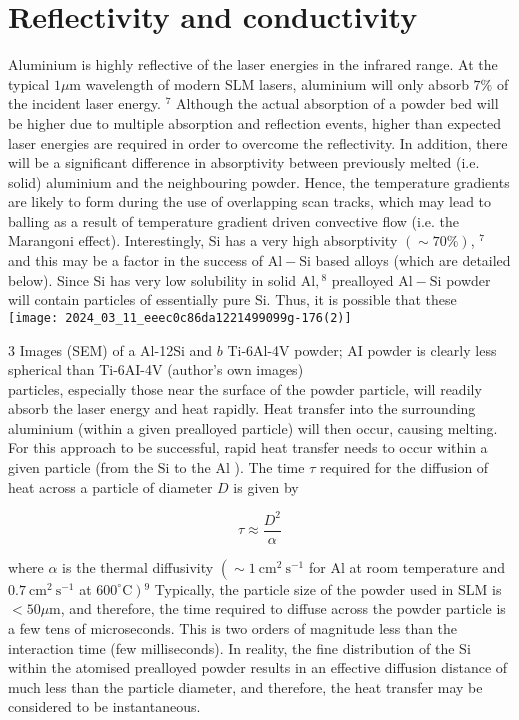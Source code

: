 \documentclass[10pt]{article}
\begin{document}
\section*{Reflectivity and conductivity}
Aluminium is highly reflective of the laser energies in the infrared range. At the typical $1 \mu \mathrm{m}$ wavelength of modern SLM lasers, aluminium will only absorb $7 \%$ of the incident laser energy. ${ }^{7}$ Although the actual absorption of a powder bed will be higher due to multiple absorption and reflection events, higher than expected laser energies are required in order to overcome the reflectivity. In addition, there will be a significant difference in absorptivity between previously melted (i.e. solid) aluminium and the neighbouring powder. Hence, the temperature gradients are likely to form during the use of overlapping scan tracks, which may lead to balling as a result of temperature gradient driven convective flow (i.e. the Marangoni effect). Interestingly, Si has a very high absorptivity $(\sim 70 \%)$, ${ }^{7}$ and this may be a factor in the success of $\mathrm{Al}-\mathrm{Si}$ based alloys (which are detailed below). Since Si has very low solubility in solid $\mathrm{Al},{ }^{8}$ prealloyed $\mathrm{Al}-\mathrm{Si}$ powder will contain particles of essentially pure $\mathrm{Si}$. Thus, it is possible that these\\
\texttt{[image: 2024\_03\_11\_eeec0c86da1221499099g-176(2)]}

3 Images (SEM) of a Al-12Si and $b$ Ti-6Al-4V powder; AI powder is clearly less spherical than Ti-6AI-4V (author's own images)\\
particles, especially those near the surface of the powder particle, will readily absorb the laser energy and heat rapidly. Heat transfer into the surrounding aluminium (within a given prealloyed particle) will then occur, causing melting. For this approach to be successful, rapid heat transfer needs to occur within a given particle (from the $\mathrm{Si}$ to the $\mathrm{Al}$ ). The time $\tau$ required for the diffusion of heat across a particle of diameter $D$ is given by


\begin{equation*}
\tau \approx \frac{D^{2}}{\alpha} \tag{4}
\end{equation*}


where $\alpha$ is the thermal diffusivity $\left(\sim 1 \mathrm{~cm}^{2} \mathrm{~s}^{-1}\right.$ for $\mathrm{Al}$ at room temperature and $0.7 \mathrm{~cm}^{2} \mathrm{~s}^{-1}$ at $\left.600^{\circ} \mathrm{C}\right){ }^{9}$ Typically, the particle size of the powder used in SLM is $<50 \mu \mathrm{m}$, and therefore, the time required to diffuse across the powder particle is a few tens of microseconds. This is two orders of magnitude less than the interaction time (few milliseconds). In reality, the fine distribution of the Si within the atomised prealloyed powder results in an effective diffusion distance of much less than the particle diameter, and therefore, the heat transfer may be considered to be instantaneous.
\end{document}
